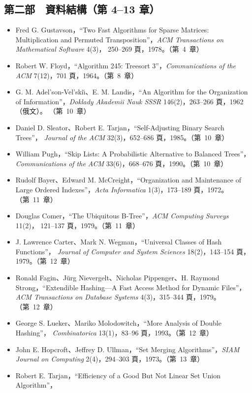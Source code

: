 \subsection*{第二部　資料結構（第 4--13 章）}

\begin{itemize}
\item Fred G. Gustavson，``Two Fast Algorithms for Sparse Matrices: Multiplication and
Permuted Transposition''，\textit{ACM Transactions on Mathematical Software} 4(3)，
250--269 頁，1978。（第~4~章）
\item Robert W. Floyd，``Algorithm 245: Treesort 3''，\textit{Communications of the ACM}
7(12)，701 頁，1964。（第~8~章）
\item G. M. Adel'son-Vel'ski\u{\i}、E. M. Landis，``An Algorithm for the Organization of
Information''，\textit{Doklady Akademii Nauk SSSR} 146(2)，263--266 頁，1962（俄文）。
（第~10~章）
\item Daniel D. Sleator、Robert E. Tarjan，``Self-Adjusting Binary Search Trees''，
\textit{Journal of the ACM} 32(3)，652--686 頁，1985。（第~10~章）
\item William Pugh，``Skip Lists: A Probabilistic Alternative to Balanced Trees''，
\textit{Communications of the ACM} 33(6)，668--676 頁，1990。（第~10~章）
\item Rudolf Bayer、Edward M. McCreight，``Organization and Maintenance of Large Ordered
Indexes''，\textit{Acta Informatica} 1(3)，173--189 頁，1972。（第~11~章）
\item Douglas Comer，``The Ubiquitous B-Tree''，\textit{ACM Computing Surveys} 11(2)，
121--137 頁，1979。（第~11~章）
\item J. Lawrence Carter、Mark N. Wegman，``Universal Classes of Hash Functions''，
\textit{Journal of Computer and System Sciences} 18(2)，143--154 頁，1979。（第~12~章）
\item Ronald Fagin、Jürg Nievergelt、Nicholas Pippenger、H. Raymond Strong，``Extendible
Hashing---A Fast Access Method for Dynamic Files''，\textit{ACM Transactions on Database
Systems} 4(3)，315--344 頁，1979。（第~12~章）
\item George S. Lueker、Mariko Molodowitch，``More Analysis of Double Hashing''，
\textit{Combinatorica} 13(1)，83--96 頁，1993。（第~12~章）
\item John E. Hopcroft、Jeffrey D. Ullman，``Set Merging Algorithms''，\textit{SIAM
Journal on Computing} 2(4)，294--303 頁，1973。（第~13~章）
\item Robert E. Tarjan，``Efficiency of a Good But Not Linear Set Union Algorithm''，

\end{itemize}
